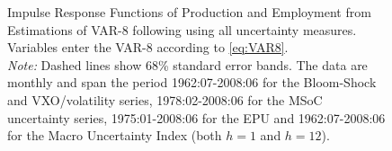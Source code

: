 \documentclass[a4paper,12pt,oneside,pointednumbers,bibtotoc,bigheadings,liststotoc]{scrbook}
\begin{document}
\begin{figure}[!h]
   \centering
   \setlength\fboxsep{0pt}
   \setlength\fboxrule{0pt}
      \caption[Impulse Response Functions of Production and Employment from Estimations of VAR-8 following \citet{bloom:09} using all uncertainty measures.]{Impulse Response Functions of Production and Employment from Estimations of VAR-8 following \citet{bloom:09} using all uncertainty measures. Variables enter the VAR-8 according to \ref{eq:VAR8}.\\
      \textit{Note:} Dashed lines show 68\% standard error bands. The data are monthly and span the period 1962:07-2008:06 for the Bloom-Shock and VXO/volatility series, 1978:02-2008:06 for the MSoC uncertainty series, 1975:01-2008:06 for the EPU and 1962:07-2008:06 for the Macro Uncertainty Index (both $h=1$ and $h=12$).}   \label{fig:VAR8_HP_until2008}
\end{figure}
\end{document}
